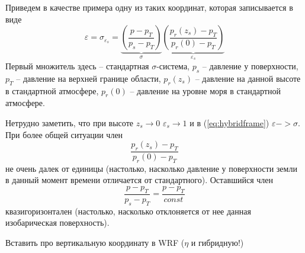 

Приведем в качестве примера одну из таких координат, которая записывается в виде
    \begin{equation}
    \label{eq:hybridframe}
        \varepsilon= \sigma_{\varepsilon_s} =
        \underbrace{\left( \frac{p-p_T}{p_s-p_T} \right)}_{\sigma}
        \underbrace{\left( \frac{p_r(z_s) - p_T}{p_r(0) - p_T} \right)}_{\varepsilon_s}
    \end{equation}
Первый множитель здесь -- стандартная $\sigma$-система, $p_s$ -- давление у поверхности, $p_T$ -- давление на верхней границе области, $p_r(z_s)$ -- давление на данной высоте в стандартной атмосфере, $p_r(0)$ -- давление на уровне моря в стандартной атмосфере. 

Нетрудно заметить, что при высоте $z_s\rightarrow0$ $\varepsilon_s\rightarrow1$ и в (\ref{eq:hybridframe}) $\varepsilon->\sigma$. При более общей ситуации член 
    \begin{equation*}
         \frac{p_r(z_s) - p_T}{p_r(0) - p_T} 
    \end{equation*}
не очень далек от единицы (настолько, насколько давление у поверхности земли в данный момент времени отличается от стандартного). Оставшийся член 
    \begin{equation*}
         \frac{p-p_T}{p_s-p_T}=\frac{p-p_T}{const} 
    \end{equation*}
квазигоризонтален (настолько, насколько отклоняется от нее данная изобарическая поверхность).

   \begin{warn}
        Вставить про вертикальную координату в WRF ($\eta$ и гибридную!) 
   \end{warn}
